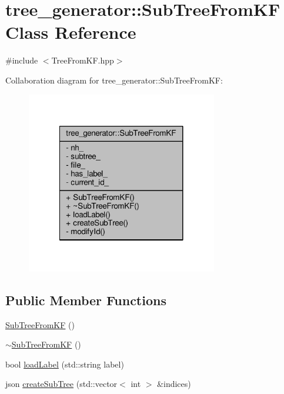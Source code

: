 \hypertarget{classtree__generator_1_1SubTreeFromKF}{\section{tree\-\_\-generator\-:\-:Sub\-Tree\-From\-K\-F Class Reference}
\label{classtree__generator_1_1SubTreeFromKF}
}


{\ttfamily \#include $<$Tree\-From\-K\-F.\-hpp$>$}



Collaboration diagram for tree\-\_\-generator\-:\-:Sub\-Tree\-From\-K\-F\-:\nopagebreak
\begin{figure}[H]
\begin{center}
\leavevmode
\includegraphics[width=236pt]{de/d5a/classtree__generator_1_1SubTreeFromKF__coll__graph}
\end{center}
\end{figure}
\subsection*{Public Member Functions}
\begin{DoxyCompactItemize}
\item 
\hyperlink{classtree__generator_1_1SubTreeFromKF_ab7af1f33766b79ffb8d596db12a567f4_ab7af1f33766b79ffb8d596db12a567f4}{Sub\-Tree\-From\-K\-F} ()
\item 
\hyperlink{classtree__generator_1_1SubTreeFromKF_aa6f44a5c131577ea1719a3fa3a28d65d_aa6f44a5c131577ea1719a3fa3a28d65d}{$\sim$\-Sub\-Tree\-From\-K\-F} ()
\item 
bool \hyperlink{classtree__generator_1_1SubTreeFromKF_a3e4e089333af3305e40434e49dcc0878_a3e4e089333af3305e40434e49dcc0878}{load\-Label} (std\-::string label)
\item 
json \hyperlink{classtree__generator_1_1SubTreeFromKF_a531cc034d2af6a380a40763894542760_a531cc034d2af6a380a40763894542760}{create\-Sub\-Tree} (std\-::vector$<$ int $>$ \&indices)
\end{DoxyCompactItemize}
